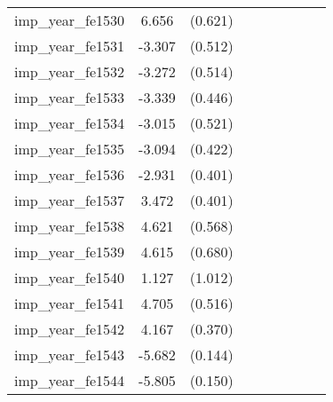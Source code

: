 {\begin{tabular}{l*{4}{cc}}
imp\_year\_fe1530&    6.656\sym{***}&  (0.621)&                  &         &                  &         &                  &         \\
imp\_year\_fe1531&   -3.307\sym{***}&  (0.512)&                  &         &                  &         &                  &         \\
imp\_year\_fe1532&   -3.272\sym{***}&  (0.514)&                  &         &                  &         &                  &         \\
imp\_year\_fe1533&   -3.339\sym{***}&  (0.446)&                  &         &                  &         &                  &         \\
imp\_year\_fe1534&   -3.015\sym{***}&  (0.521)&                  &         &                  &         &                  &         \\
imp\_year\_fe1535&   -3.094\sym{***}&  (0.422)&                  &         &                  &         &                  &         \\
imp\_year\_fe1536&   -2.931\sym{***}&  (0.401)&                  &         &                  &         &                  &         \\
imp\_year\_fe1537&    3.472\sym{***}&  (0.401)&                  &         &                  &         &                  &         \\
imp\_year\_fe1538&    4.621\sym{***}&  (0.568)&                  &         &                  &         &                  &         \\
imp\_year\_fe1539&    4.615\sym{***}&  (0.680)&                  &         &                  &         &                  &         \\
imp\_year\_fe1540&    1.127         &  (1.012)&                  &         &                  &         &                  &         \\
imp\_year\_fe1541&    4.705\sym{***}&  (0.516)&                  &         &                  &         &                  &         \\
imp\_year\_fe1542&    4.167\sym{***}&  (0.370)&                  &         &                  &         &                  &         \\
imp\_year\_fe1543&   -5.682\sym{***}&  (0.144)&                  &         &                  &         &                  &         \\
imp\_year\_fe1544&   -5.805\sym{***}&  (0.150)&                  &         &                  &         &                  &         \\

\end{tabular}}
